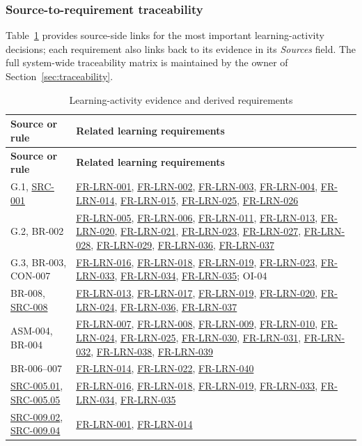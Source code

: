 \documentclass[12pt]{article}
\renewcommand{\_}{\textunderscore\allowbreak}%
\newcommand{\reqref}[1]{\hyperref[req:#1]{#1}}
\newcommand{\srcref}[1]{\hyperref[src:#1]{SRC-#1}}
\begin{document}
\subsubsection{Source-to-requirement traceability}
Table~\ref{tab:lrn-traces} provides source-side links for the most important
learning-activity decisions; each requirement also links back to its evidence in
its \emph{Sources} field. The full system-wide traceability matrix is maintained
by the owner of Section~\ref{sec:traceability}.

{\small
\begin{longtable}{@{}p{}p{}@{}}
\caption{Learning-activity evidence and derived requirements}
\label{tab:lrn-traces}\\
\toprule
\textbf{Source or rule} & \textbf{Related learning requirements}\\
\midrule
\endfirsthead
\toprule
\textbf{Source or rule} & \textbf{Related learning requirements}\\
\midrule
\endhead
\bottomrule
\endlastfoot
G.1, \srcref{001} & \reqref{FR-LRN-001}, \reqref{FR-LRN-002},
\reqref{FR-LRN-003}, \reqref{FR-LRN-004}, \reqref{FR-LRN-014},
\reqref{FR-LRN-015}, \reqref{FR-LRN-025}, \reqref{FR-LRN-026}\\
G.2, BR-002 & \reqref{FR-LRN-005}, \reqref{FR-LRN-006}, \reqref{FR-LRN-011},
\reqref{FR-LRN-013}, \reqref{FR-LRN-020}, \reqref{FR-LRN-021},
\reqref{FR-LRN-023}, \reqref{FR-LRN-027}, \reqref{FR-LRN-028}, \reqref{FR-LRN-029}, \reqref{FR-LRN-036}, \reqref{FR-LRN-037}\\
G.3, BR-003, CON-007 & \reqref{FR-LRN-016}, \reqref{FR-LRN-018},
\reqref{FR-LRN-019}, \reqref{FR-LRN-023}, \reqref{FR-LRN-033}, \reqref{FR-LRN-034}, \reqref{FR-LRN-035}; OI-04\\
BR-008, \srcref{008} & \reqref{FR-LRN-013}, \reqref{FR-LRN-017},
\reqref{FR-LRN-019}, \reqref{FR-LRN-020}, \reqref{FR-LRN-024}, \reqref{FR-LRN-036}, \reqref{FR-LRN-037}\\
ASM-004, BR-004 & \reqref{FR-LRN-007}, \reqref{FR-LRN-008}, \reqref{FR-LRN-009},
\reqref{FR-LRN-010}, \reqref{FR-LRN-024}, \reqref{FR-LRN-025}, \reqref{FR-LRN-030}, \reqref{FR-LRN-031}, \reqref{FR-LRN-032}, \reqref{FR-LRN-038}, \reqref{FR-LRN-039}\\
BR-006--007 & \reqref{FR-LRN-014}, \reqref{FR-LRN-022}, \reqref{FR-LRN-040}\\
\hyperref[src:005.01]{SRC-005.01}, \hyperref[src:005.05]{SRC-005.05} &
\reqref{FR-LRN-016}, \reqref{FR-LRN-018}, \reqref{FR-LRN-019}, \reqref{FR-LRN-033}, \reqref{FR-LRN-034}, \reqref{FR-LRN-035}\\
\hyperref[src:009.02]{SRC-009.02}, \hyperref[src:009.04]{SRC-009.04} &
\reqref{FR-LRN-001}, \reqref{FR-LRN-014}\\
\end{longtable}
}
\end{document}
